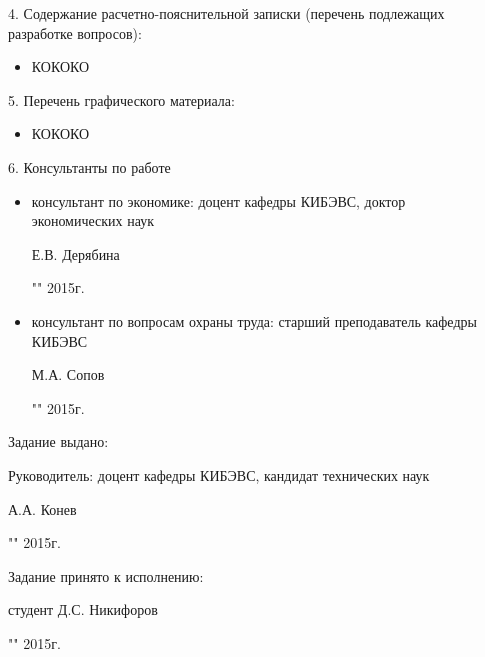4. Содержание расчетно-пояснительной записки (перечень подлежащих разработке вопросов):

\begin{itemize}
 \item КОКОКО
\end{itemize}

5. Перечень графического материала:

\begin{itemize}
 \item КОКОКО
\end{itemize}

6. Консультанты по работе

\begin{itemize}
 \item консультант по экономике: доцент кафедры КИБЭВС, доктор \\ экономических наук \\
 \begin{singlespace}
 Е.В. Дерябина \hfill \underline{\hspace{6cm}} \\
 \begin{flushright} "\underline{\hspace{1cm}}"\underline{\hspace{3cm}} 2015г. \end{flushright}
 \end{singlespace}
 \item консультант по вопросам охраны труда: старший преподаватель кафедры КИБЭВС\\
 \begin{singlespace}
 М.А. Сопов \hfill \underline{\hspace{6cm}} \\
 \begin{flushright} "\underline{\hspace{1cm}}"\underline{\hspace{3cm}} 2015г. \end{flushright}
 \end{singlespace}
\end{itemize}

Задание выдано:

Руководитель: доцент кафедры КИБЭВС, кандидат технических наук \\
\begin{singlespace}
А.А. Конев \hfill \underline{\hspace{6cm}} \\
\begin{flushright} "\underline{\hspace{1cm}}"\underline{\hspace{3cm}} 2015г. \end{flushright}
\end{singlespace}

Задание принято к исполнению:

\begin{singlespace}
студент Д.С. Никифоров \hfill \underline{\hspace{6cm}} \\
\begin{flushright} "\underline{\hspace{1cm}}"\underline{\hspace{3cm}} 2015г. \end{flushright}
\end{singlespace}